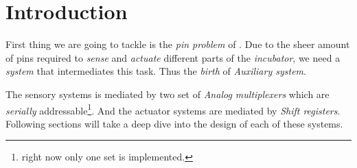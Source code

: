 \documentclass[../../main]{subfiles}
\begin{document}
\section{Introduction} \label{sec:}

First thing we are going to tackle is the \emph{pin problem} of \esp. Due to
the sheer amount of pins required to \emph{sense} and \emph{actuate} different
parts of the \emph{incubator}, we need a \emph{system} that intermediates this
task. Thus the \emph{birth} of \emph{Auxiliary system}.

The sensory systems is mediated by two set of \emph{Analog multiplexers} which are
\emph{serially} addressable\footnote{right now only one set is implemented.}. And the
actuator systems are mediated by \emph{Shift registers}. Following sections will
take a deep dive into the design of each of these systems.
\end{document}
